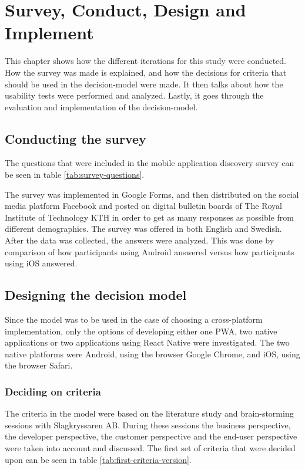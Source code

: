 \section{Survey, Conduct, Design and Implement }

This chapter shows how the different iterations for this study were conducted. How the survey was made is explained, and how the decisions for criteria that should be used in the decision-model were made. It then talks about how the usability tests were performed and analyzed. Lastly, it goes through the evaluation and implementation of the decision-model.

\subsection{Conducting the survey}

The questions that were included in the mobile application discovery survey can be seen in table \ref{tab:survey-questions}.
\renewcommand{\arraystretch}{1.5}



 The survey was implemented in Google Forms, and then distributed on the social media platform Facebook and posted on digital bulletin boards of The Royal Institute of Technology KTH in order to get as many responses as possible from different demographics. The survey was offered in both English and Swedish. After the data was collected, the answers were analyzed. This was done by comparison of how participants using Android answered versus how participants using iOS answered.

\subsection{Designing the decision model}

Since the model was to be used in the case of choosing a cross-platform implementation, only the options of developing either one PWA, two native applications or two applications using React Native were investigated. The two native platforms were Android, using the browser Google Chrome, and iOS, using the browser Safari.

\subsubsection{Deciding on criteria}

The criteria in the model were based on the literature study and brain-storming sessions with Slagkryssaren AB. During these sessions the business perspective, the developer perspective, the customer perspective and the end-user perspective were taken into account and discussed. The first set of criteria that were decided upon can be seen in table \ref{tab:first-criteria-version}. 


